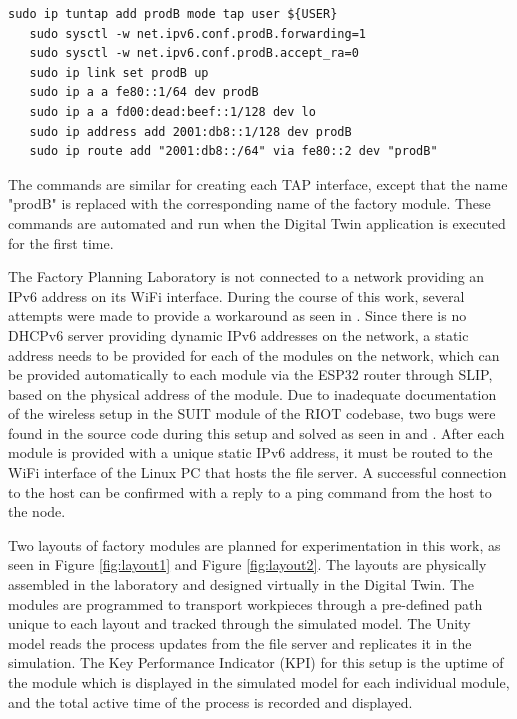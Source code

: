 \begin{lstlisting}[caption=Linux Commands for ethos setup for each module]
   sudo ip tuntap add prodB mode tap user ${USER}
   sudo sysctl -w net.ipv6.conf.prodB.forwarding=1
   sudo sysctl -w net.ipv6.conf.prodB.accept_ra=0
   sudo ip link set prodB up
   sudo ip a a fe80::1/64 dev prodB
   sudo ip a a fd00:dead:beef::1/128 dev lo
   sudo ip address add 2001:db8::1/128 dev prodB
   sudo ip route add "2001:db8::/64" via fe80::2 dev "prodB"
\end{lstlisting}

The commands are similar for creating each TAP interface, except that the name "prodB" is replaced with the corresponding name of the factory module. These commands are automated and run when the Digital Twin application is executed for the first time. 

The Factory Planning Laboratory is not connected to a network providing an IPv6 address on its WiFi interface. During the course of this work, several attempts were made to provide a workaround as seen in \cite{Valentin_Tangirala_2023}. Since there is no DHCPv6 server providing dynamic IPv6 addresses on the network, a static address needs to be provided for each of the modules on the network, which can be provided automatically to each module via the ESP32 router through SLIP, based on the physical address of the module. Due to inadequate documentation of the wireless setup in the SUIT module of the RIOT codebase, two bugs were found in the source code during this setup and solved as seen in \cite{Valentin_2023} and \cite{Valentin_2023b}. After each module is provided with a unique static IPv6 address, it must be routed to the WiFi interface of the Linux PC that hosts the file server. A successful connection to the host can be confirmed with a reply to a ping command from the host to the node.

Two layouts of factory modules are planned for experimentation in this work, as seen in Figure \ref{fig:layout1} and Figure \ref{fig:layout2}. The layouts are physically assembled in the laboratory and designed virtually in the Digital Twin. The modules are programmed to transport workpieces through a pre-defined path unique to each layout and tracked through the simulated model. The Unity model reads the process updates from the file server and replicates it in the simulation. The Key Performance Indicator (KPI) for this setup is the uptime of the module which is displayed in the simulated model for each individual module, and the total active time of the process is recorded and displayed.

